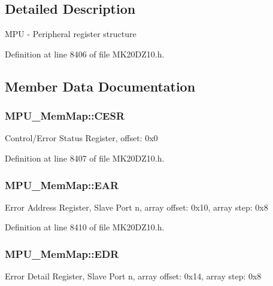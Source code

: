 \subsection{Detailed Description}
M\+PU -\/ Peripheral register structure 

Definition at line 8406 of file M\+K20\+D\+Z10.\+h.



\subsection{Member Data Documentation}
\subsubsection[{\texorpdfstring{C\+E\+SR}{CESR}}]{ M\+P\+U\+\_\+\+Mem\+Map\+::\+C\+E\+SR}\hypertarget{struct_m_p_u___mem_map_a1cc318bbbdd6c24c5d1ce0df9ebc3c8a}{}\label{struct_m_p_u___mem_map_a1cc318bbbdd6c24c5d1ce0df9ebc3c8a}
Control/\+Error Status Register, offset\+: 0x0 

Definition at line 8407 of file M\+K20\+D\+Z10.\+h.

\subsubsection[{\texorpdfstring{E\+AR}{EAR}}]{ M\+P\+U\+\_\+\+Mem\+Map\+::\+E\+AR}\hypertarget{struct_m_p_u___mem_map_af28c58a8a9b1388f572207a9fcb3cad6}{}\label{struct_m_p_u___mem_map_af28c58a8a9b1388f572207a9fcb3cad6}
Error Address Register, Slave Port n, array offset\+: 0x10, array step\+: 0x8 

Definition at line 8410 of file M\+K20\+D\+Z10.\+h.

\subsubsection[{\texorpdfstring{E\+DR}{EDR}}]{ M\+P\+U\+\_\+\+Mem\+Map\+::\+E\+DR}\hypertarget{struct_m_p_u___mem_map_aada7844acbf37325b398320ad59b2049}{}\label{struct_m_p_u___mem_map_aada7844acbf37325b398320ad59b2049}
Error Detail Register, Slave Port n, array offset\+: 0x14, array step\+: 0x8 

